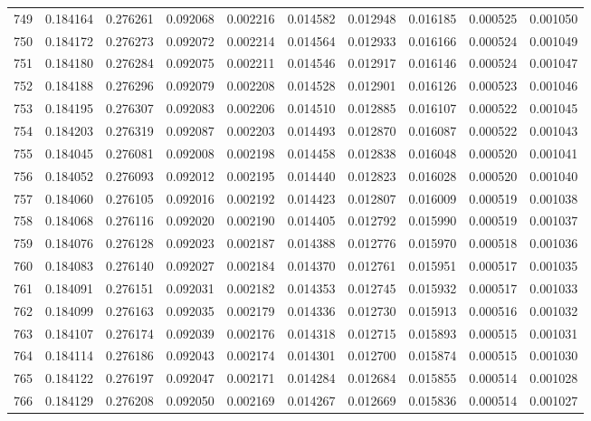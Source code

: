 \begin{tabular}{lrrrrrrrrr}
749 & 0.184164 & 0.276261 & 0.092068 & 0.002216 & 0.014582 & 0.012948 & 0.016185 & 0.000525 & 0.001050 \\
750 & 0.184172 & 0.276273 & 0.092072 & 0.002214 & 0.014564 & 0.012933 & 0.016166 & 0.000524 & 0.001049 \\
751 & 0.184180 & 0.276284 & 0.092075 & 0.002211 & 0.014546 & 0.012917 & 0.016146 & 0.000524 & 0.001047 \\
752 & 0.184188 & 0.276296 & 0.092079 & 0.002208 & 0.014528 & 0.012901 & 0.016126 & 0.000523 & 0.001046 \\
753 & 0.184195 & 0.276307 & 0.092083 & 0.002206 & 0.014510 & 0.012885 & 0.016107 & 0.000522 & 0.001045 \\
754 & 0.184203 & 0.276319 & 0.092087 & 0.002203 & 0.014493 & 0.012870 & 0.016087 & 0.000522 & 0.001043 \\
755 & 0.184045 & 0.276081 & 0.092008 & 0.002198 & 0.014458 & 0.012838 & 0.016048 & 0.000520 & 0.001041 \\
756 & 0.184052 & 0.276093 & 0.092012 & 0.002195 & 0.014440 & 0.012823 & 0.016028 & 0.000520 & 0.001040 \\
757 & 0.184060 & 0.276105 & 0.092016 & 0.002192 & 0.014423 & 0.012807 & 0.016009 & 0.000519 & 0.001038 \\
758 & 0.184068 & 0.276116 & 0.092020 & 0.002190 & 0.014405 & 0.012792 & 0.015990 & 0.000519 & 0.001037 \\
759 & 0.184076 & 0.276128 & 0.092023 & 0.002187 & 0.014388 & 0.012776 & 0.015970 & 0.000518 & 0.001036 \\
760 & 0.184083 & 0.276140 & 0.092027 & 0.002184 & 0.014370 & 0.012761 & 0.015951 & 0.000517 & 0.001035 \\
761 & 0.184091 & 0.276151 & 0.092031 & 0.002182 & 0.014353 & 0.012745 & 0.015932 & 0.000517 & 0.001033 \\
762 & 0.184099 & 0.276163 & 0.092035 & 0.002179 & 0.014336 & 0.012730 & 0.015913 & 0.000516 & 0.001032 \\
763 & 0.184107 & 0.276174 & 0.092039 & 0.002176 & 0.014318 & 0.012715 & 0.015893 & 0.000515 & 0.001031 \\
764 & 0.184114 & 0.276186 & 0.092043 & 0.002174 & 0.014301 & 0.012700 & 0.015874 & 0.000515 & 0.001030 \\
765 & 0.184122 & 0.276197 & 0.092047 & 0.002171 & 0.014284 & 0.012684 & 0.015855 & 0.000514 & 0.001028 \\
766 & 0.184129 & 0.276208 & 0.092050 & 0.002169 & 0.014267 & 0.012669 & 0.015836 & 0.000514 & 0.001027 \\

\end{tabular}
